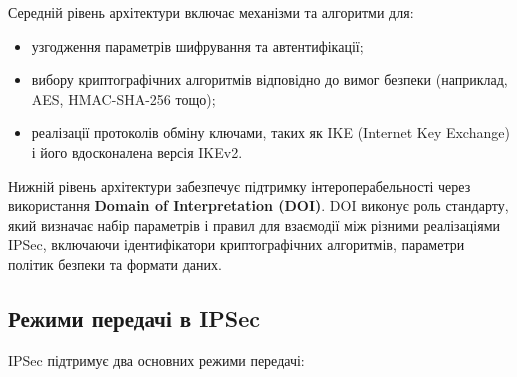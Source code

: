 Середній рівень архітектури включає механізми та алгоритми для:
\begin{itemize}
    \item узгодження параметрів шифрування та автентифікації;
    \item вибору криптографічних алгоритмів відповідно до вимог безпеки (наприклад, AES, HMAC-SHA-256 тощо);
    \item реалізації протоколів обміну ключами, таких як IKE (Internet Key Exchange) і його вдосконалена версія IKEv2.
\end{itemize}

Нижній рівень архітектури забезпечує підтримку інтероперабельності через використання \textbf{Domain of Interpretation (DOI)}. DOI виконує роль стандарту, який визначає набір параметрів і правил для взаємодії між різними реалізаціями IPSec, включаючи ідентифікатори криптографічних алгоритмів, параметри політик безпеки та формати даних.

\subsection{Режими передачі в IPSec}
IPSec підтримує два основних режими передачі:

